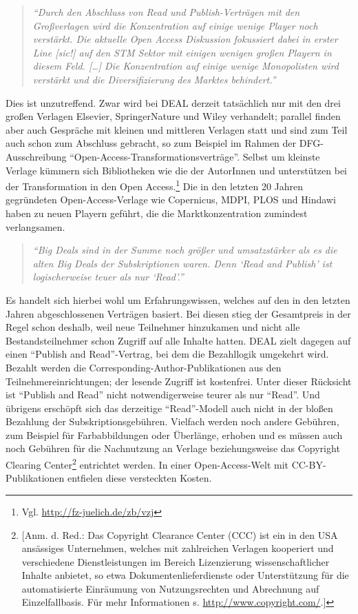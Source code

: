 \documentclass[a4paper,
fontsize=11pt,
oneside,
numbers=noperiodatend,
parskip=half-,
bibliography=totoc,
final
]{scrartcl}
\begin{document}
\begin{quote}
\emph{\enquote{Durch den Abschluss von Read und Publish-Verträgen mit
den Großverlagen wird die Konzentration auf einige wenige Player noch
verstärkt. Die aktuelle Open Access Diskussion fokussiert dabei in
erster Line {[}sic!{]} auf den STM Sektor mit einigen wenigen großen
Playern in diesem Feld. {[}\ldots{}{]} Die Konzentration auf einige
wenige Monopolisten wird verstärkt und die Diversifizierung des Marktes
behindert.}}
\end{quote}

Dies ist unzutreffend. Zwar wird bei DEAL derzeit tatsächlich nur mit
den drei großen Verlagen Elsevier, SpringerNature und Wiley verhandelt;
parallel finden aber auch Gespräche mit kleinen und mittleren Verlagen
statt und sind zum Teil auch schon zum Abschluss gebracht, so zum
Beispiel im Rahmen der DFG-Ausschreibung
\enquote{Open-Access-Transformationsverträge}. Selbst um kleinste
Verlage kümmern sich Bibliotheken wie die der AutorInnen und
unterstützen bei der Transformation in den Open Access.\footnote{Vgl.
  \url{http://fz-juelich.de/zb/vzj}} Die in den letzten 20 Jahren
gegründeten Open-Access-Verlage wie Copernicus, MDPI, PLOS und Hindawi
haben zu neuen Playern geführt, die die Marktkonzentration zumindest
verlangsamen.

\begin{quote}
\emph{\enquote{Big Deals sind in der Summe noch größer und umsatzstärker
als es die alten Big Deals der Subskriptionen waren. Denn \enquote{Read
and Publish} ist logischerweise teuer als nur \enquote{Read}.}}
\end{quote}

Es handelt sich hierbei wohl um Erfahrungswissen, welches auf den in den
letzten Jahren abgeschlossenen Verträgen basiert. Bei diesen stieg der
Gesamtpreis in der Regel schon deshalb, weil neue Teilnehmer hinzukamen
und nicht alle Bestandsteilnehmer schon Zugriff auf alle Inhalte hatten.
DEAL zielt dagegen auf einen \enquote{Publish and Read}-Vertrag, bei dem
die Bezahllogik umgekehrt wird. Bezahlt werden die
Corresponding-Author-Publikationen aus den Teilnehmereinrichtungen; der
lesende Zugriff ist kostenfrei. Unter dieser Rücksicht ist
\enquote{Publish and Read} nicht notwendigerweise teurer als nur
\enquote{Read}. Und übrigens erschöpft sich das derzeitige
\enquote{Read}-Modell auch nicht in der bloßen Bezahlung der
Subskriptionsgebühren. Vielfach werden noch andere Gebühren, zum
Beispiel für Farbabbildungen oder Überlänge, erhoben und es müssen auch
noch Gebühren für die Nachnutzung an Verlage beziehungsweise das
Copyright Clearing Center\footnote{{[}Anm. d. Red.: Das Copyright
  Clearance Center (CCC) ist ein in den USA ansässiges Unternehmen,
  welches mit zahlreichen Verlagen kooperiert und verschiedene
  Dienstleistungen im Bereich Lizenzierung wissenschaftlicher Inhalte
  anbietet, so etwa Dokumentenlieferdienste oder Unterstützung für die
  automatisierte Einräumung von Nutzungsrechten und Abrechnung auf
  Einzelfallbasis. Für mehr Informationen s.
  \url{http://www.copyright.com/}.{]}} entrichtet werden. In einer
Open-Access-Welt mit CC-BY-Publikationen entfielen diese versteckten
Kosten.
\end{document}
